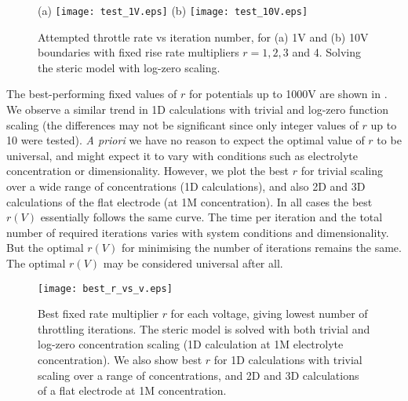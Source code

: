 \begin{figure}
\centering
(a)
\texttt{[image: test\_1V.eps]}
(b)
\texttt{[image: test\_10V.eps]}
\caption{Attempted throttle rate vs iteration number, for (a) 1V and
  (b) 10V  boundaries with fixed rise rate multipliers $r=1,2,3$ and
  4. Solving the steric model with log-zero scaling.
}
\label{fig:throttle_rate}
\end{figure}

The best-performing fixed values of $r$  for potentials up to 1000V are shown
in  .  We observe a similar trend in 1D calculations with
trivial and log-zero function scaling  (the
differences may not be significant since only integer values of $r$ up
to 10 were tested). \textit{A priori} we have no reason to expect the
optimal value of $r$ to be universal, and might expect it to vary with
conditions such as electrolyte concentration or
dimensionality. However, we plot the best $r$ for trivial
scaling over  a wide range of concentrations (1D calculations), and
also 2D and 3D calculations of the flat electrode (at 1M
concentration). In all cases the best $r(V)$  essentially follows the
same curve.  The time per iteration and the total number of
required iterations varies with system conditions and
dimensionality. But the optimal $r(V)$ for minimising the number of
iterations remains the same. The optimal $r(V)$ may be considered universal after all.



\begin{figure}
\centering
\texttt{[image: best\_r\_vs\_v.eps]}
\caption{Best fixed rate multiplier $r$ for each voltage, giving lowest
  number of throttling iterations. The steric model is solved with both
  trivial and log-zero concentration scaling (1D calculation at 1M
  electrolyte concentration).
  We also show best $r$ for 1D calculations with trivial scaling over a range of
  concentrations,
  and 2D and 3D calculations of a flat electrode at 1M concentration.
}
\label{fig:best_throttle_rate}
\end{figure}


